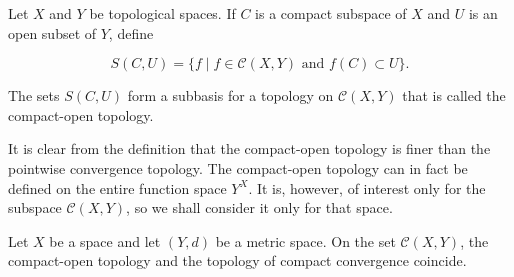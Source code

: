 \begin{definition}
Let \(X\) and \(Y\) be topological spaces. If \(C\) is a compact subspace of \(X\) and \(U\) is an open subset of \(Y\), define

\[
S({C,U}) = \{ f \mid f \in \mathcal{C}({X,Y}) \text{ and }f( C) \subset U\}.
\]

The sets \(S({C,U})\) form a subbasis for a topology on \(\mathcal{C}({X,Y})\) that is called the compact-open topology.
\end{definition}

It is clear from the definition that the compact-open topology is finer than the pointwise convergence topology. The compact-open topology can in fact be defined on the entire function space \(Y^{X}\). It is, however, of interest only for the subspace \(\mathcal{C}({X,Y})\), so we shall consider it only for that space.

\begin{theorem}
\label{thm:\thetheorem}
Let \(X\) be a space and let \((Y, d)\) be a metric space. On the set \(\mathcal{C}({X,Y})\), the compact-open topology and the topology of compact convergence coincide.
\end{theorem}

